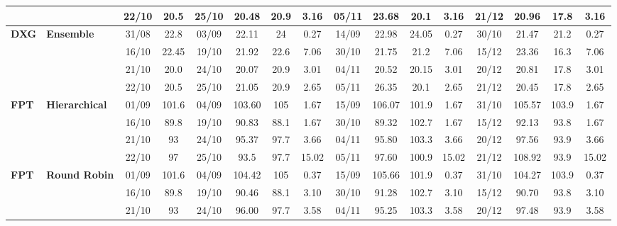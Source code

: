 \documentclass{ieeeaccess}
\begin{document}
\begin{table}[!h]
\begin{tabular}{llcc|cccc|cccc|cccc}
&
& 22/10 & 20.5 & 25/10 & 20.48 & 20.9 & 3.16 & 05/11 & 23.68 & 20.1 & 3.16 & 21/12 & 20.96 & 17.8 & 3.16 \\
\midrule


\multirow{4}{*}{\textbf{DXG}} 
& \textbf{Ensemble}
& 31/08 & 22.8 & 03/09 & 22.11 & 24 & 0.27 & 14/09 & 22.98 & 24.05 & 0.27 & 30/10 & 21.47 & 21.2 & 0.27 \\

&
& 16/10 & 22.45 & 19/10 & 21.92 & 22.6 & 7.06 & 30/10 & 21.75 & 21.2 & 7.06 & 15/12 & 23.36 & 16.3 & 7.06 \\

&
& 21/10 & 20.0 & 24/10 & 20.07 & 20.9 & 3.01 & 04/11 & 20.52 & 20.15 & 3.01 & 20/12 & 20.81 & 17.8 & 3.01 \\

&
& 22/10 & 20.5 & 25/10 & 21.05 & 20.9 & 2.65 & 05/11 & 26.35 & 20.1 & 2.65 & 21/12 & 20.45 & 17.8 & 2.65 \\
\midrule



\multirow{4}{*}{\textbf{FPT}} 
& \textbf{Hierarchical}
& 01/09 & 101.6 & 04/09 & 103.60 & 105 & 1.67 & 15/09 & 106.07 & 101.9 & 1.67 & 31/10 & 105.57 & 103.9 & 1.67 \\

&
& 16/10 & 89.8 & 19/10 & 90.83 & 88.1 & 1.67 & 30/10 & 89.32 & 102.7 & 1.67 & 15/12 & 92.13 & 93.8 & 1.67 \\

&
& 21/10 & 93 & 24/10 & 95.37 & 97.7 & 3.66 & 04/11 & 95.80 & 103.3 & 3.66 & 20/12 & 97.56 & 93.9 &3.66\\

&
& 22/10 & 97 & 25/10 & 93.5 & 97.7 & 15.02 & 05/11 & 97.60 & 100.9 & 15.02 & 21/12 & 108.92 & 93.9 & 15.02 \\
\midrule


\multirow{4}{*}{\textbf{FPT}} 
& \textbf{Round Robin}
& 01/09 & 101.6 & 04/09 & 104.42 & 105 & 0.37 & 15/09 & 105.66 & 101.9 & 0.37 & 31/10 & 104.27 & 103.9 & 0.37 \\

&
& 16/10 & 89.8 & 19/10 & 90.46 & 88.1 & 3.10 & 30/10 & 91.28 & 102.7 & 3.10 & 15/12 & 90.70 & 93.8 & 3.10 \\

&
& 21/10 & 93 & 24/10 & 96.00 & 97.7 & 3.58 & 04/11 & 95.25 & 103.3 & 3.58 & 20/12 & 97.48 & 93.9 & 3.58 \\


\end{tabular}
\end{table}
\end{document}
